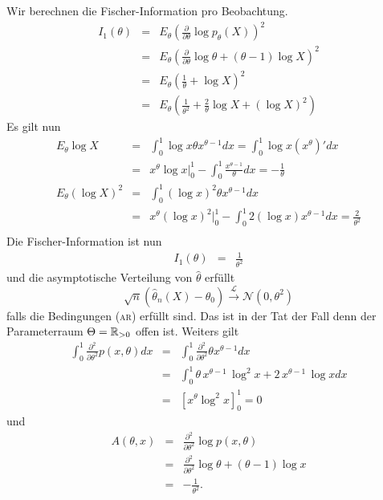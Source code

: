 Wir berechnen die Fischer-Information pro Beobachtung. 
\begin{eqnarray}
    I_1(\theta) &=& E_\theta \left( \frac{\partial}{\partial \theta} \log p_\theta(X) \right)^2 \\
    &=& E_\theta \left( \frac{\partial}{\partial\theta} \log \theta + (\theta-1) \log X \right)^2 \\
    &=& E_\theta \left( \frac{1}{\theta} + \log X \right)^2 \\
    &=& E_\theta \left( \frac{1}{\theta^2} + \frac{2}{\theta} \log X + (\log X)^2 \right)
\end{eqnarray}
Es gilt nun
\begin{eqnarray}
    E_\theta \log X &=&  \int_{0}^{1} \log x \theta x^{\theta-1} dx = \int_{0}^{1} \log x (x^{\theta})' dx \\
    &=& x^\theta \log x \Big|_0^1 - \int_{0}^{1} \frac{x^{\theta-1}}{\theta} dx = - \frac{1}{\theta} \\
    E_\theta (\log X)^2 &=&  \int_{0}^{1} (\log x)^2 \theta x^{\theta-1} dx \\ 
    &=& x^\theta (\log x)^2 \Big|_0^1 - \int_{0}^{1} 2(\log x) x^{\theta-1} dx = \frac{2}{\theta^2} \\
\end{eqnarray}
Die Fischer-Information ist nun
\begin{eqnarray}
    I_1(\theta) &=& \frac{1}{\theta^2}
\end{eqnarray}
und die asymptotische Verteilung von $\hat \theta$ erfüllt
\begin{equation}
    \sqrt{n}\left( \hat\theta_n(X) - \theta_0 \right) \xrightarrow{\mathcal{L}} \mathcal N(0, \theta^2)
\end{equation}
falls die Bedingungen \textsc{(ar)} erfüllt sind. Das ist in der Tat der Fall denn der Parameterraum
$\Theta=\mathbb R_{>0}$ offen ist. Weiters gilt
\begin{eqnarray}
    \int_{0}^{1} \frac{\partial^2}{\partial\theta^2} p(x,\theta) dx &=& 
    \int_{0}^{1} \frac{\partial^2}{\partial\theta^2} \theta x^{\theta-1} dx \\
    &=&  \int_{0}^{1} \theta\,x^{\theta-1}\,\log ^2x+2\,x^{\theta-1}\,\log x dx\\
    &=& \left[   x^{\theta} \log^2x  \right]_0^1 = 0
\end{eqnarray}
und
\begin{eqnarray}
    A(\theta,x) &=& \frac{\partial^2}{\partial \theta^2} \log p(x,\theta) \\
    &=& \frac{\partial^2}{\partial \theta^2} \log \theta + (\theta-1) \log x \\
    &=& -\frac{1}{\theta ^2}. 
\end{eqnarray}

